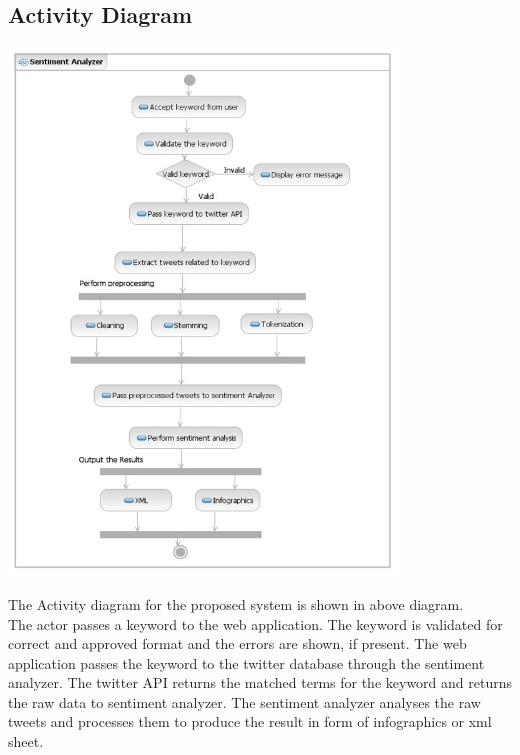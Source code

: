 \documentclass[a4paper,12pt]{report}
\begin{document}
\subsection{Activity Diagram}
\begin{center}
	\includegraphics[height=14cm]{images/activity.jpg}
\end{center}
\hspace*{\parindent}The Activity diagram for the proposed system is shown in above diagram.\\
\hspace*{\parindent}The actor passes a keyword to the web application. The keyword is validated for correct and approved format and the errors are shown, if present. The web application passes the keyword to the twitter database through the sentiment analyzer. The twitter API returns the matched terms for the keyword and returns the raw data to sentiment analyzer. The sentiment analyzer analyses the raw tweets and processes them to produce the result in form of infographics or xml sheet.
\end{document}
